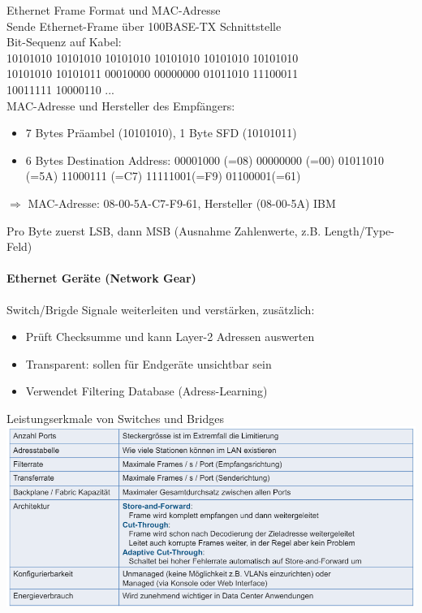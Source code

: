 \begin{example2}{Ethernet Frame Format und MAC-Adresse}\\
    Sende Ethernet-Frame über 100BASE-TX Schnittstelle\\ Bit-Sequenz auf Kabel:\\
    10101010 10101010 10101010 10101010 10101010 10101010\\
    10101010 10101011 00010000 00000000 01011010 11100011\\
    10011111 10000110 ...\\
    MAC-Adresse und Hersteller des Empfängers:
    \begin{itemize}
        \item 7 Bytes Präambel (10101010), 1 Byte SFD (10101011)
        \item 6 Bytes Destination Address: 00001000 (=08) 00000000 (=00) 01011010 (=5A) 11000111 (=C7) 11111001(=F9) 01100001(=61)
    \end{itemize}
    $\Rightarrow$ MAC-Adresse: 08-00-5A-C7-F9-61, Hersteller (08-00-5A) IBM
\end{example2}

\begin{remark}
    Pro Byte zuerst LSB, dann MSB (Ausnahme Zahlenwerte, z.B. Length/Type-Feld)
\end{remark}

\paragraph{Ethernet Geräte (Network Gear)}

\begin{definition}{Switch/Brigde} Signale weiterleiten und verstärken, zusätzlich:
    \begin{itemize}
        \item Prüft Checksumme und kann Layer-2 Adressen auswerten
        \item Transparent: sollen für Endgeräte unsichtbar sein
        \item Verwendet Filtering Database (Adress-Learning)
    \end{itemize}
\end{definition}

\begin{theorem}{Leistungserkmale von Switches und Bridges}\\
    \includegraphics[width=1\linewidth]{images/merkmale_switches_bridges.png}
\end{theorem}


